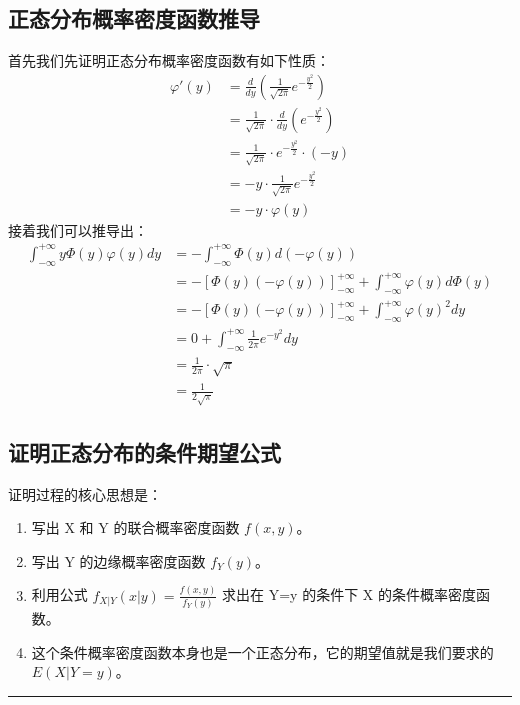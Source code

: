 \documentclass[UTF8]{ctexart}
\begin{document}
\subsection*{正态分布概率密度函数推导}
首先我们先证明正态分布概率密度函数有如下性质：
$$
\begin{align*}
    \varphi'(y) &= \frac{d}{dy}\left(\frac{1}{\sqrt{2\pi}}e^{-\frac{y^2}{2}}\right) \\
    &= \frac{1}{\sqrt{2\pi}} \cdot \frac{d}{dy}\left(e^{-\frac{y^2}{2}}\right) \\
    &= \frac{1}{\sqrt{2\pi}} \cdot e^{-\frac{y^2}{2}} \cdot \left(-y\right) \\
    &= -y \cdot \frac{1}{\sqrt{2\pi}}e^{-\frac{y^2}{2}} \\
    &= -y \cdot \varphi(y)
\end{align*}
$$
接着我们可以推导出：
$$
\begin{align*}
    \int_{-\infty}^{+\infty} y\Phi(y)\varphi(y)dy
    &= -\int_{-\infty}^{+\infty} \Phi(y)d(-\varphi(y)) \\
    &= -\left[\Phi(y)(-\varphi(y))\right]_{-\infty}^{+\infty} + \int_{-\infty}^{+\infty} \varphi(y)d\Phi(y) \\
    &= -\left[\Phi(y)(-\varphi(y))\right]_{-\infty}^{+\infty} + \int_{-\infty}^{+\infty} \varphi(y)^2 dy \\
    &= 0 + \int_{-\infty}^{+\infty} \frac{1}{2\pi}e^{-y^2} dy \\
    &= \frac{1}{2\pi} \cdot \sqrt{\pi} \\
    &= \frac{1}{2\sqrt{\pi}}
\end{align*}
$$

\subsection*{证明正态分布的条件期望公式}
\noindent 证明过程的核心思想是：
\begin{enumerate}
    \item 写出 X 和 Y 的联合概率密度函数 $f(x, y)$。
    \item 写出 Y 的边缘概率密度函数 $f_Y(y)$。
    \item 利用公式 $f_{X|Y}(x|y) = \frac{f(x, y)}{f_Y(y)}$ 求出在 Y=y 的条件下 X 的条件概率密度函数。
    \item 这个条件概率密度函数本身也是一个正态分布，它的期望值就是我们要求的 $E(X|Y=y)$。
\end{enumerate}

\hrule
\vspace{1em}
\end{document}
